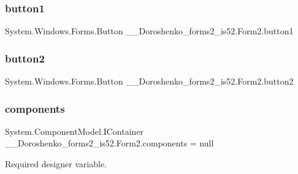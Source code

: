 \subsubsection{\texorpdfstring{button1}{button1}}
{\footnotesize\ttfamily System.\+Windows.\+Forms.\+Button \+\_\+\_\+\+Doroshenko\+\_\+forms2\+\_\+is52.\+Form2.\+button1\hspace{0.3cm}{\ttfamily [private]}}

\hypertarget{class__7___doroshenko__forms2__is52_1_1_form2_a79a4244ff4d4724d7adbdbe18c507101}{}\label{class__7___doroshenko__forms2__is52_1_1_form2_a79a4244ff4d4724d7adbdbe18c507101} 
\subsubsection{\texorpdfstring{button2}{button2}}
{\footnotesize\ttfamily System.\+Windows.\+Forms.\+Button \+\_\+\_\+\+Doroshenko\+\_\+forms2\+\_\+is52.\+Form2.\+button2\hspace{0.3cm}{\ttfamily [private]}}

\hypertarget{class__7___doroshenko__forms2__is52_1_1_form2_a2c42c130f4868ba02465c3191a1830f7}{}\label{class__7___doroshenko__forms2__is52_1_1_form2_a2c42c130f4868ba02465c3191a1830f7} 
\subsubsection{\texorpdfstring{components}{components}}
{\footnotesize\ttfamily System.\+Component\+Model.\+I\+Container \+\_\+\_\+\+Doroshenko\+\_\+forms2\+\_\+is52.\+Form2.\+components = null\hspace{0.3cm}{\ttfamily [private]}}



Required designer variable. 

\hypertarget{class__7___doroshenko__forms2__is52_1_1_form2_a59b455b99b00b5cb53fccdb041ffa130}{}\label{class__7___doroshenko__forms2__is52_1_1_form2_a59b455b99b00b5cb53fccdb041ffa130} 
